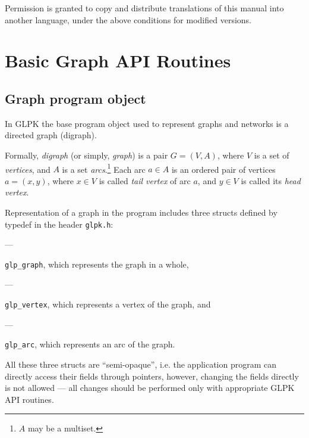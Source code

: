 \documentclass[11pt]{report}
\newcommand{\Item}[1]{\parbox[t]{\parindent}{#1}}
\begin{document}
\noindent
Permission is granted to copy and distribute translations of this manual
into another language, under the above conditions for modified versions.


\newpage

{\setlength{\parskip}{0pt}\tableofcontents}


\chapter{Basic Graph API Routines}

\section{Graph program object}

In GLPK the base program object used to represent graphs and networks
is a directed graph (digraph).

Formally, {\it digraph} (or simply, {\it graph}) is a pair $G=(V,A)$,
where $V$ is a set of {\it vertices}, and $A$ is a set
{\it arcs}.\footnote{$A$ may be a multiset.} Each arc $a\in A$ is an
ordered pair of vertices $a=(x,y)$, where $x\in V$ is called {\it tail
vertex} of arc $a$, and $y\in V$ is called its {\it head vertex}.

Representation of a graph in the program includes three structs defined
by typedef in the header \verb|glpk.h|:


\Item{---}\verb|glp_graph|, which represents the graph in a whole,

\Item{---}\verb|glp_vertex|, which represents a vertex of the graph, and

\Item{---}\verb|glp_arc|, which represents an arc of the graph.


All these three structs are ``semi-opaque'', i.e. the application
program can directly access their fields through pointers, however,
changing the fields directly is not allowed --- all changes should be
performed only with appropriate GLPK API routines.
\end{document}

